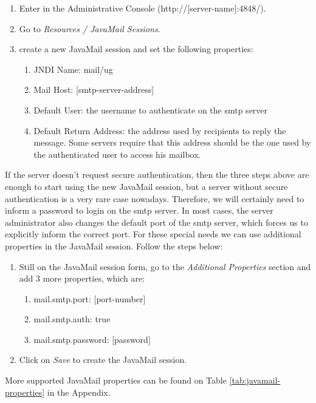 \documentclass[envcountsame,envcountchap]{svmono}
\begin{document}
\begin{enumerate}
\item Enter in the Administrative Console (http://[server-name]:4848/).
\item Go to \textit{Resources / JavaMail Sessions}.
\item create a new JavaMail session and set the following properties:
   \begin{enumerate}
   \item JNDI Name: mail/ug
   \item Mail Host: [smtp-server-address]
   \item Default User: the username to authenticate on the smtp
    server
   \item Default Return Address: the address used by recipients to
    reply the message. Some servers require that this address
    should be the one used by the authenticated user to access his
    mailbox.
   \end{enumerate}
\end{enumerate}
 
If the server doesn't request secure authentication, then the three steps above are enough to start using the new JavaMail session, but a server without secure authentication is a very rare case nowadays. Therefore, we will certainly need to inform a password to login on the smtp server. In most cases, the server administrator also changes the default port of the smtp server, which forces us to explicitly inform the correct port. For these special needs we can use additional properties in the JavaMail session. Follow the steps below:

\begin{enumerate}
\item Still on the JavaMail session form, go to the \textit{Additional Properties} section and add 3 more properties, which are:
   \begin{enumerate}
   \item mail.smtp.port: [port-number]
   \item mail.smtp.auth: true
   \item mail.smtp.password: [password]
   \end{enumerate}
\item Click on \textit{Save} to create the JavaMail session.
\end{enumerate}

More supported JavaMail properties can be found on Table \ref{tab:javamail-properties} in the Appendix.
\end{document}
